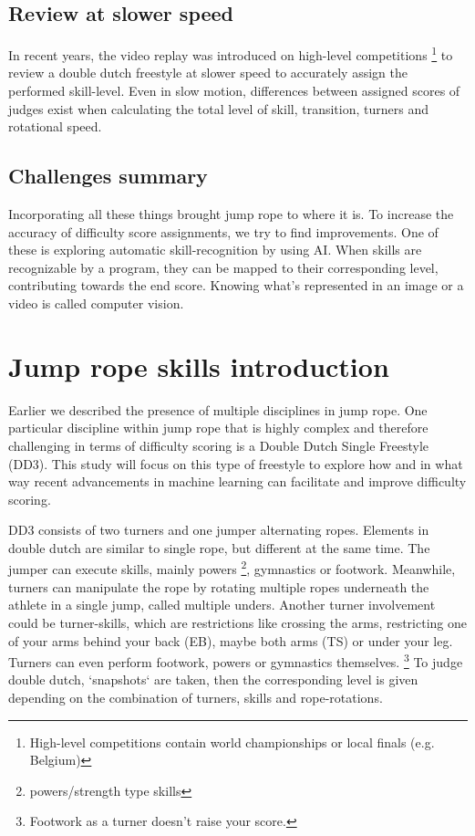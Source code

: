 \subsection{Review at slower speed}
In recent years, the video replay was introduced on high-level competitions \footnote{High-level competitions contain world championships or local finals (e.g. Belgium)} to review a double dutch freestyle at slower speed to accurately assign the performed skill-level.
Even in slow motion, differences between assigned scores of judges exist when calculating the total level of skill, transition, turners and rotational speed.

\subsection{Challenges summary}
Incorporating all these things brought jump rope to where it is. To increase the accuracy of difficulty score assignments, we try to find improvements. One of these is exploring automatic skill-recognition by using AI. When skills are recognizable by a program, they can be mapped to their corresponding level, contributing towards the end score. Knowing what's represented in an image or a video is called computer vision. %

\section{Jump rope skills introduction}
\label{subsec:bp-literature-basisskills}

Earlier we described the presence of multiple disciplines in jump rope. One particular discipline within jump rope that is highly complex and therefore challenging in terms of difficulty scoring is a Double Dutch Single Freestyle (DD3). This study will focus on this type of freestyle to explore how and in what way recent advancements in machine learning can facilitate and improve difficulty scoring.

\medskip

DD3 consists of two turners and one jumper alternating ropes. Elements in double dutch are similar to single rope, but different at the same time. The jumper can execute skills, mainly powers \footnote{powers/strength type skills}, gymnastics or footwork. Meanwhile, turners can manipulate the rope by rotating multiple ropes underneath the athlete in a single jump, called multiple unders. Another turner involvement could be turner-skills, which are restrictions like crossing the arms, restricting one of your arms behind your back (EB), maybe both arms (TS) or under your leg. Turners can even perform footwork, powers or gymnastics themselves. \footnote{Footwork as a turner doesn't raise your score.}
To judge double dutch, `snapshots` are taken, then the corresponding level is given depending on the combination of turners, skills and rope-rotations.

